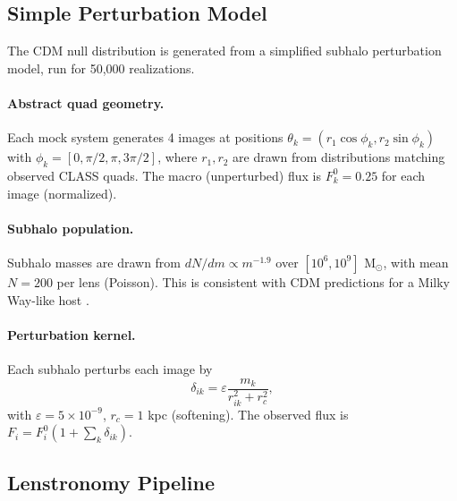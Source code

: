 \documentclass[12pt]{article}
\begin{document}
\clearpage
\subsection{Simple Perturbation Model}
\label{sec:simple}

The CDM null distribution is generated from a simplified subhalo perturbation
model, run for 50,000 realizations.

\paragraph{Abstract quad geometry.}
Each mock system generates 4 images at positions
$\theta_k = (r_1 \cos\phi_k, r_2 \sin\phi_k)$ with
$\phi_k = [0, \pi/2, \pi, 3\pi/2]$, where $r_1, r_2$ are drawn from
distributions matching observed CLASS quads.
The macro (unperturbed) flux is $F_k^0 = 0.25$ for each image (normalized).

\paragraph{Subhalo population.}
Subhalo masses are drawn from $dN/dm \propto m^{-1.9}$ over
$[10^6, 10^9]$ M$_\odot$, with mean $N = 200$ per lens (Poisson).
This is consistent with CDM predictions for a Milky Way-like host
\cite{Springel2008}.

\paragraph{Perturbation kernel.}
Each subhalo perturbs each image by
\begin{equation}
\delta_{ik} = \varepsilon \frac{m_k}{r_{ik}^2 + r_c^2},
\end{equation}
with $\varepsilon = 5\times10^{-9}$, $r_c = 1$ kpc (softening).
The observed flux is $F_i = F_i^0 (1 + \sum_k \delta_{ik})$.

\subsection{Lenstronomy Pipeline}
\label{sec:lens}
\end{document}
